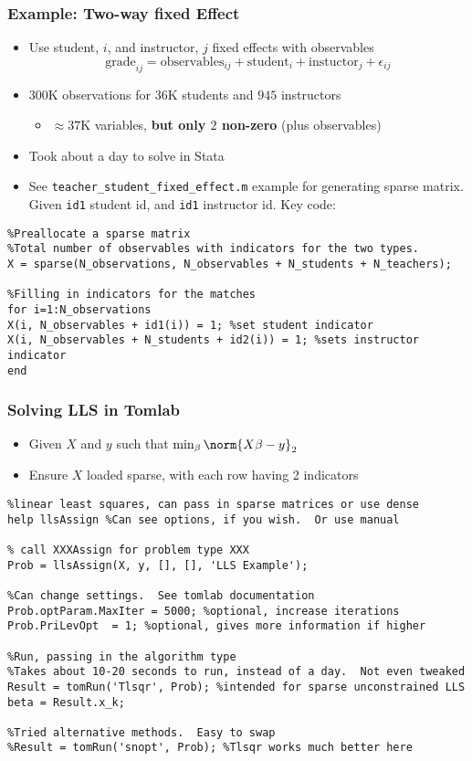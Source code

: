 \documentclass[nofootline]{etk-presentation}
\begin{document}
\begin{frame}[fragile]	\frametitle{Example: Two-way fixed Effect}
	\begin{itemize}
		\item 	Use student, $i$, and instructor, $j$ fixed effects with observables
			$$
		\text{grade}_{ij} = \text{observables}_{ij} + \text{student}_i + \text{instuctor}_j + \epsilon_{ij}
		$$
		\item $300$K observations for $36$K students and $945$ instructors
		\begin{itemize}
			\item $\approx 37$K variables, \textbf{but only $2$ non-zero} (plus observables)
		\end{itemize}
		\item Took about a day to solve in Stata
		\item See \verb!teacher_student_fixed_effect.m! example for generating sparse matrix.  Given \verb!id1! student id, and \verb!id1! instructor id.  Key code:
	\end{itemize}
\begin{verbatim}
%Preallocate a sparse matrix
%Total number of observables with indicators for the two types.
X = sparse(N_observations, N_observables + N_students + N_teachers); 

%Filling in indicators for the matches
for i=1:N_observations
X(i, N_observables + id1(i)) = 1; %set student indicator
X(i, N_observables + N_students + id2(i)) = 1; %sets instructor indicator
end
\end{verbatim}
\end{frame}

\begin{frame}[fragile]	\frametitle{Solving LLS in Tomlab}
	\begin{itemize}
		\item Given $X$ and $y$ such that $\min_\beta\norm{X \beta - y}_2$
		\item Ensure $X$ loaded sparse, with each row having 2 indicators
	\end{itemize}
\begin{verbatim}
%linear least squares, can pass in sparse matrices or use dense
help llsAssign %Can see options, if you wish.  Or use manual

% call XXXAssign for problem type XXX
Prob = llsAssign(X, y, [], [], 'LLS Example'); 

%Can change settings.  See tomlab documentation
Prob.optParam.MaxIter = 5000; %optional, increase iterations
Prob.PriLevOpt  = 1; %optional, gives more information if higher

%Run, passing in the algorithm type
%Takes about 10-20 seconds to run, instead of a day.  Not even tweaked
Result = tomRun('Tlsqr', Prob); %intended for sparse unconstrained LLS
beta = Result.x_k;

%Tried alternative methods.  Easy to swap
%Result = tomRun('snopt', Prob); %Tlsqr works much better here
\end{verbatim}

\end{frame}
	
\end{document}
